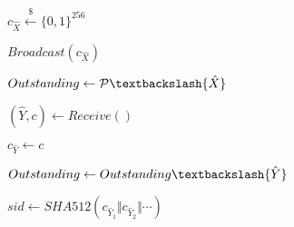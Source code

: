   \Begin
  {
    $c_{\hat{X}} \xleftarrow{\$} \{0,1\}^{256}$

    $Broadcast(c_{\hat{X}})$

    $Outstanding \leftarrow \mathcal{P} \textbackslash \{\hat{X}\}$

    {
      $(\hat{Y}, c) \leftarrow Receive()$

      {
        $c_{\hat{Y}} \leftarrow c$

        $Outstanding \leftarrow Outstanding \textbackslash \{\hat{Y}\}$
      }
    }

    $sid \leftarrow SHA512(c_{\hat{Y}_1} \Vert c_{\hat{Y}_2} \Vert \cdots)$

  }
